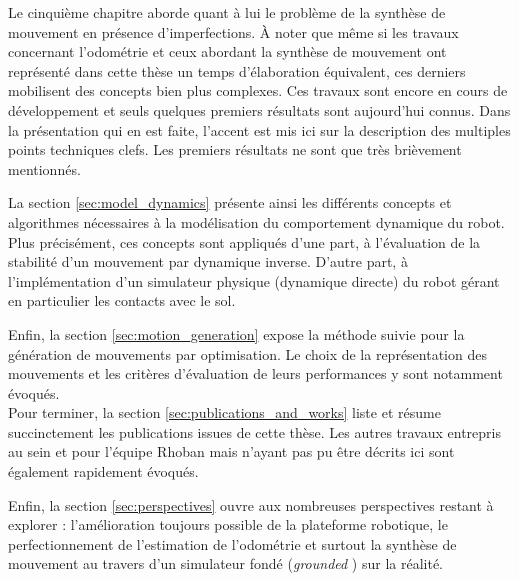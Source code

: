 Le cinquième chapitre aborde quant à lui le problème
de la synthèse de mouvement en présence d'imperfections.
À noter que même si les travaux concernant l'odométrie et ceux
abordant la synthèse de mouvement ont représenté dans cette thèse 
un temps d'élaboration équivalent, ces derniers mobilisent des 
concepts bien plus complexes.
Ces travaux sont encore en cours de développement 
et seuls quelques premiers résultats sont aujourd'hui connus.
Dans la présentation qui en est faite, l'accent est mis ici 
sur la description des multiples points techniques clefs.
Les premiers résultats ne sont que très brièvement mentionnés.

La section \ref{sec:model_dynamics} présente ainsi les différents 
concepts et algorithmes nécessaires à la modélisation 
du comportement dynamique du robot.
Plus précisément, ces concepts sont appliqués d'une part, à
l'évaluation de la stabilité d'un mouvement par dynamique inverse.
D'autre part, à l'implémentation d'un simulateur physique (dynamique directe)
du robot gérant en particulier les contacts avec le sol.

Enfin, la section \ref{sec:motion_generation} expose la méthode 
suivie pour la génération de mouvements par optimisation.
Le choix de la représentation des mouvements et les critères 
d'évaluation de leurs performances y sont notamment évoqués.\\

Pour terminer, la section \ref{sec:publications_and_works} liste et résume
succinctement les publications issues de cette thèse.
Les autres travaux entrepris au sein et pour l'équipe Rhoban mais 
n'ayant pas pu être décrits ici sont également rapidement évoqués. 

Enfin, la section \ref{sec:perspectives} ouvre aux nombreuses 
perspectives restant à explorer :
l'amélioration toujours possible de la plateforme robotique, 
le perfectionnement de l'estimation de l'odométrie
et surtout la synthèse de mouvement au travers d'un simulateur
fondé (\og \textit{grounded} \fg) sur la réalité.\\

